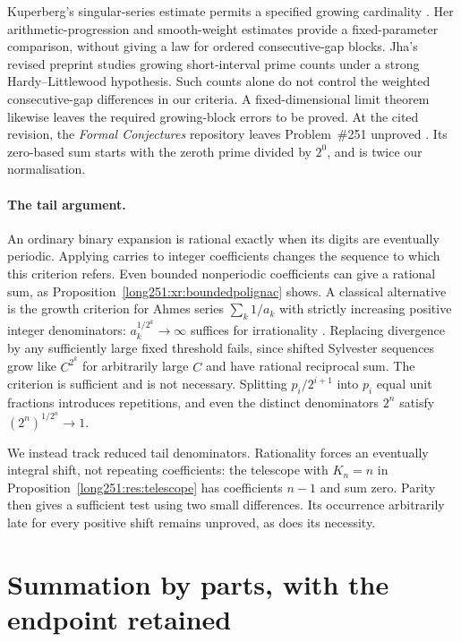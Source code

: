 Kuperberg's singular-series estimate permits a specified growing
cardinality \cite[Theorem~1.1]{kuperberg2023}.
Her arithmetic-progression and smooth-weight estimates
\cite{kuperbergweighted2025} provide a fixed-parameter comparison, without
giving a law for ordered consecutive-gap blocks.
Jha's revised preprint \cite{jha2026} studies growing short-interval
prime counts under a strong Hardy--Littlewood hypothesis.  Such counts
alone do not control the weighted consecutive-gap differences in our
criteria.  A fixed-dimensional limit theorem likewise leaves the required
growing-block errors to be proved.
At the cited revision, the \emph{Formal Conjectures} repository leaves
Problem~\#251 unproved \cite{formalconjectures251}.
Its zero-based sum starts with the zeroth prime divided by $2^0$,
and is twice our normalisation.

\paragraph{The tail argument.}
An ordinary binary expansion is rational exactly when its digits are
eventually periodic.  Applying carries to integer coefficients changes
the sequence to which this criterion refers.  Even bounded nonperiodic
coefficients can give a rational sum, as
Proposition~\ref{long251:xr:boundedpolignac} shows.
A classical alternative is the growth criterion for Ahmes series
$\sum_k1/a_k$ with strictly increasing positive integer denominators:
$a_k^{1/2^k}\to\infty$ suffices for irrationality
\cite{erdosstraus1963}\cite[\S1]{kovactao2024}.
Replacing divergence by any sufficiently large fixed threshold fails,
since shifted Sylvester sequences grow like $C^{2^k}$ for arbitrarily
large $C$ and have rational reciprocal sum.  The criterion is sufficient
and is not necessary.  Splitting $p_i/2^{i+1}$ into $p_i$ equal unit
fractions introduces repetitions, and even the distinct denominators
$2^n$ satisfy $(2^n)^{1/2^n}\to1$.

We instead track reduced tail denominators.  Rationality forces an
eventually integral shift, not repeating coefficients: the telescope
with $K_n=n$ in Proposition~\ref{long251:res:telescope} has coefficients
$n-1$ and sum zero.  Parity then gives a sufficient test using two small
differences.  Its occurrence arbitrarily late for every positive shift
remains unproved, as does its necessity.

\section{Summation by parts, with the endpoint retained}\label{long251:sec:parts}

